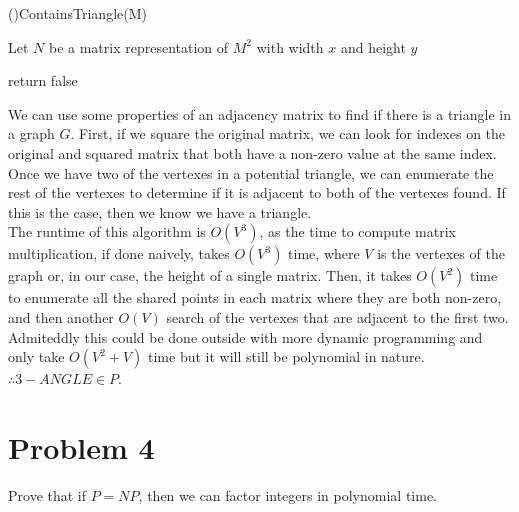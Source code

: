 \documentclass[11pt]{amsart}
\begin{document}
\begin{algorithm}[H]
    \Fn(){ContainsTriangle(M)}{
    \SetAlgoLined
    \SetNoFillComment
    \DontPrintSemicolon
        Let $N$ be a matrix representation of $M^2$ with width $x$ and height $y$
         {
             {
                 {
                }
            }
        }

        return false
    }
    \end{algorithm}
\bigskip
\hspace*{15mm}We can use some properties of an adjacency matrix to find if there is a triangle in a graph $G$. First, if we square the original matrix, we can look for indexes on the original and squared matrix that both have a non-zero value at the same index. Once we have two of the vertexes in a potential triangle, we can enumerate the rest of the vertexes to determine if it is adjacent to both of the vertexes found. If this is the case, then we know we have a triangle.\\
\hspace*{15mm}The runtime of this algorithm is $O(V^3)$, as the time to compute matrix multiplication, if done naively, takes $O(V^3)$ time, where $V$ is the vertexes of the graph or, in our case, the height of a single matrix. Then, it takes $O(V^2)$ time to enumerate all the shared points in each matrix where they are both non-zero, and then another $O(V)$ search of the vertexes that are adjacent to the first two. Admiteddly this could be done outside with more dynamic programming and only take $O(V^2 + V)$ time but it will still be polynomial in nature.\\
$\therefore 3-ANGLE \in P$.

\newpage

\section*{Problem 4}
Prove that if $P = NP$, then we can factor integers in polynomial time.\\
\end{document}
